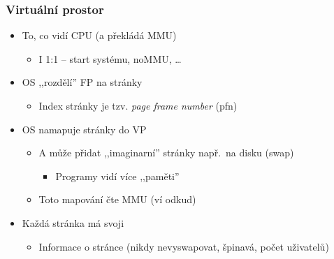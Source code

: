 \begin{frame}
  \frametitle{Virtuální prostor}

  \begin{itemize}
    \item To, co vidí CPU (a překládá MMU)
    \begin{itemize}
      \item I 1:1 -- start systému, noMMU, \ldots
    \end{itemize}

    \pause

    \item OS ,,rozdělí'' FP na stránky
    \begin{itemize}
      \item Index stránky je tzv. \emph{page frame number} (pfn)
    \end{itemize}

    \pause

    \item OS namapuje stránky do VP
    \begin{itemize}
      \item A může přidat ,,imaginarní'' stránky např.\ na disku (swap)
      \begin{itemize}
	\item Programy vidí více ,,paměti''
      \end{itemize}

      \item Toto mapování čte MMU (ví odkud)
    \end{itemize}

    \pause

    \item Každá stránka má svoji 
    \begin{itemize}
      \item Informace o stránce (nikdy nevyswapovat, špinavá, počet uživatelů)
    \end{itemize}
  \end{itemize}

\end{frame}


